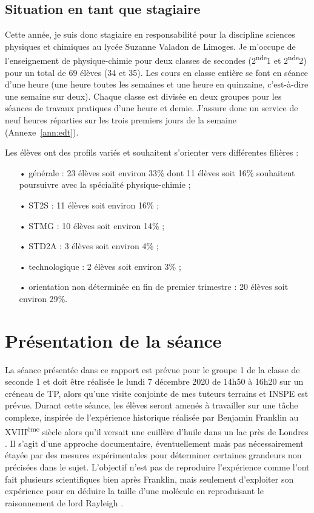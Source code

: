 \documentclass[12pt,a4paper]{article}
\newcommand{\seconde}{2\textsuperscript{nde}}
\begin{document}
\subsection{Situation en tant que stagiaire}

Cette année, je suis donc stagiaire en responsabilité pour la discipline sciences physiques et chimiques au lycée Suzanne Valadon de Limoges.
Je m'occupe de l'enseignement de physique-chimie pour deux classes de secondes (\seconde1 et \seconde2) pour un total de 69 élèves (34 et 35).
Les cours en classe entière se font en séance d'une heure (une heure toutes les semaines et une heure en quinzaine, c'est-à-dire une semaine sur deux).
Chaque classe est divisée en deux groupes pour les séances de travaux pratiques d'une heure et demie.
J'assure donc un service de neuf heures réparties sur les trois premiers jours de la semaine (Annexe~\ref{ann:edt}).

Les élèves ont des profils variés et souhaitent s'orienter vers différentes filières :
\begin{itemize}
\item[•] générale : 23 élèves soit environ \unit{33}{\%} dont 11 élèves soit \unit{16}{\%} souhaitent poursuivre avec la spécialité physique-chimie ;
\item[•] ST2S : 11 élèves soit environ \unit{16}{\%} ;
\item[•] STMG : 10 élèves soit environ \unit{14}{\%} ;
\item[•] STD2A : 3 élèves soit environ \unit{4}{\%} ;
\item[•] technologique : 2 élèves soit environ \unit{3}{\%} ;
\item[•] orientation non déterminée en fin de premier trimestre : 20 élèves soit environ \unit{29}{\%}.
\end{itemize}

\section{Présentation de la séance}

La séance présentée dans ce rapport est prévue pour le groupe 1 de la classe de seconde 1 et doit être réalisée le lundi 7 décembre 2020 de 14h50 à 16h20 sur un créneau de TP, alors qu'une visite conjointe de mes tuteurs terrains et INSPE est prévue.
Durant cette séance, les élèves seront amenés à travailler sur une tâche complexe, inspirée de l'expérience historique réalisée par Benjamin Franklin au XVIII\textsuperscript{ème} siècle alors qu'il versait une cuillère d'huile dans un lac près de Londres \cite{Franklin1773a}.
Il s'agit d'une approche documentaire, éventuellement mais pas nécessairement étayée par des mesures expérimentales pour déterminer certaines grandeurs non précisées dans le sujet.
L'objectif n'est pas de reproduire l'expérience comme l'ont fait plusieurs scientifiques bien après Franklin, mais seulement d'exploiter son expérience pour en déduire la taille d'une molécule en reproduisant le raisonnement de lord Rayleigh \cite{Rayleigh1899}.
\end{document}
